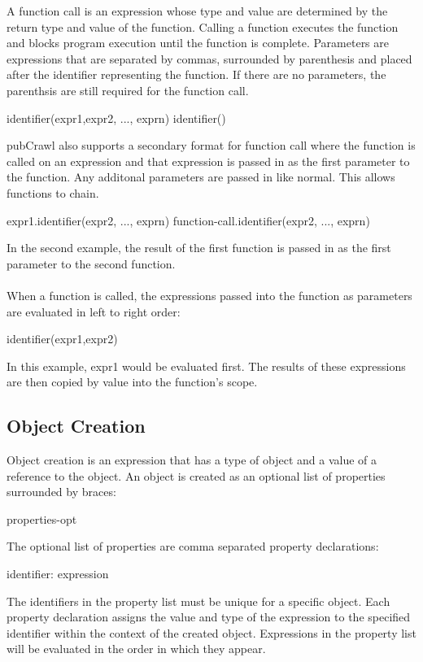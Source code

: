 \documentclass[oneside]{book}
\begin{document}
A function call is an expression whose type and value are determined by the return type and value of the function. Calling a function executes the function and blocks program execution until the function is complete. Parameters are expressions that are separated by commas, surrounded by parenthesis and placed after the identifier representing the function. If there are no parameters, the parenthsis are still required for the function call.
\begin{code}
identifier(expr1,expr2, ..., exprn)
identifier()
\end{code}
pubCrawl also supports a secondary format for function call where the function is called on an expression and that expression is passed in as the first parameter to the function. Any additonal parameters are passed in like normal. This allows functions to chain.
\begin{code}
expr1.identifier(expr2, ..., exprn)
function-call.identifier(expr2, ..., exprn)
\end{code}
In the second example, the result of the first function is passed in as the first parameter to the second function.\\\\
When a function is called, the expressions passed into the function as parameters are evaluated in left to right order:
\begin{code}
identifier(expr1,expr2)
\end{code}
In this example, expr1 would be evaluated first. The results of these expressions are then copied by value into the function's scope.


\subsection{Object Creation}

Object creation is an expression that has a type of object and a value of a reference to the object. An object is created as an optional list of properties surrounded by braces:
\begin{code}
{ properties-opt }
\end{code}
The optional list of properties are comma separated property declarations:
\begin{code}
identifier: expression
\end{code}
The identifiers in the property list must be unique for a specific object. Each property declaration assigns the value and type of the expression to the specified identifier within the context of the created object. Expressions in the property list will be evaluated in the order in which they appear.
\end{document}
